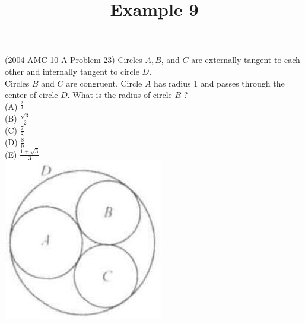 \documentclass{article}
\title{Example 9}
\date{}
\begin{document}
\maketitle

(2004 AMC 10 A Problem 23) Circles \(A, B\), and \(C\) are externally tangent to each other and internally tangent to circle \(D\).\\
Circles \(B\) and \(C\) are congruent. Circle \(A\) has radius 1 and passes through the center of circle \(D\). What is the radius of circle \(B\) ?\\
(A) \({ }^{\frac{2}{3}}\)\\
(B) \(\frac{\sqrt{3}}{2}\)\\
(C) \(\frac{7}{8}\)\\
(D) \(\frac{8}{9}\)\\
(E) \(\frac{1+\sqrt{3}}{3}\)\\
\centering
\includegraphics[width=\textwidth]{images/180.jpg}
\end{document}
